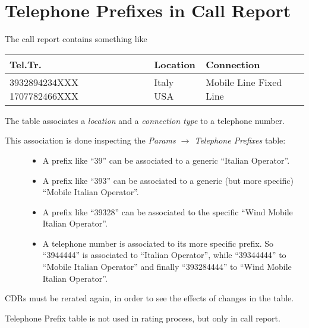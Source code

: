 \documentclass[letterpaper,10pt,english]{sphinxmanual}
\begin{document}
\section{Telephone Prefixes in Call Report}
\label{index:telephone-prefixes-in-call-report}\label{index:telephone-prefixes}
The call report contains something like

\begin{tabulary}{\linewidth}{|L|L|L|}
\hline
\textbf{
Tel.Tr.
} & \textbf{
Location
} & \textbf{
Connection
}\\
\hline

3932894234XXX
1707782466XXX
 & 
Italy
USA
 & 
Mobile Line
Fixed Line
\\
\hline
\end{tabulary}


The table associates a \emph{location} and a \emph{connection type} to a telephone number.
\begin{description}
\item[{This association is done inspecting the \emph{Params \(\rightarrow\) Telephone Prefixes} table:}] \leavevmode\begin{itemize}
\item {} 
A prefix like ``39'' can be associated to a generic ``Italian Operator''.

\item {} 
A prefix like ``393'' can be associated to a generic (but more specific) ``Mobile Italian Operator''.

\item {} 
A prefix like ``39328'' can be associated to the specific ``Wind Mobile Italian Operator''.

\item {} 
A telephone number is associated to its more specific prefix. So ``3944444'' is associated to ``Italian Operator'', while ``39344444'' to ``Mobile Italian Operator'' and finally ``393284444'' to ``Wind Mobile Italian Operator''.

\end{itemize}

\end{description}

CDRs must be rerated again, in order to see the effects of changes in the table.

Telephone Prefix table is not used in rating process, but only in call report.
\end{document}
